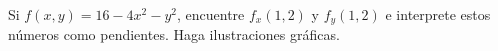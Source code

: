 \item Si $f(x, y) = 16 - 4x^2 - y^2$, encuentre $f_x(1, 2)$ y $f_y(1, 2)$ e interprete estos números como pendientes. Haga ilustraciones gráficas.

